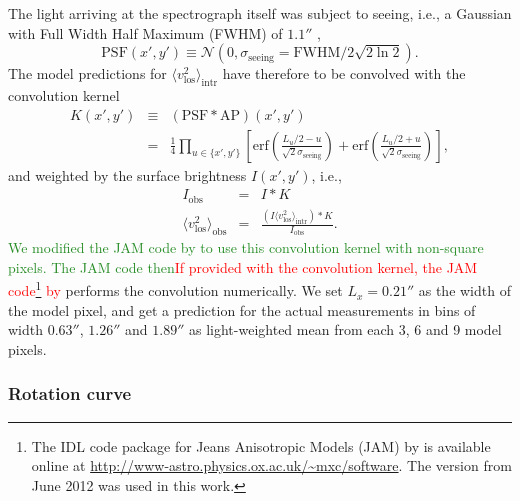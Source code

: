\documentclass[useAMS,usenatbib]{mnras}
\newcommand{\NEW}[1]{\textcolor{ForestGreen}{#1}}
\newcommand{\OLD}[1]{\textcolor{Red}{#1}}
\begin{document}
The light arriving at the spectrograph itself was subject to seeing, i.e., a Gaussian with Full Width Half Maximum (FWHM) of $1.1''$ \citep{SWELLSV},
\begin{equation}
\text{PSF}(x',y')\equiv\mathscr{N}(0,\sigma_\text{seeing}=\text{FWHM}/2\sqrt{2\ln2}).
\end{equation}
The model predictions for $\langle v_\text{los}^2 \rangle_\text{intr}$ have therefore to be convolved with the convolution kernel
\begin{eqnarray}
K(x',y') &\equiv& (\text{PSF} \ast \text{AP})(x',y') \nonumber\\
&=& \frac{1}{4} \prod_{u \in \{x',y'\}} \left[ \text{erf}\left( \frac{L_u/2 - u}{\sqrt{2}\sigma_\text{seeing}}\right) + \text{erf} \left( \frac{L_u/2 + u}{\sqrt{2} \sigma_\text{seeing}} \right) \right],
\end{eqnarray}
and weighted by the surface brightness $I(x',y')$, i.e.,
\begin{eqnarray}
I_\text{obs} &=& I \ast K\\
\langle v_\text{los}^2 \rangle_\text{obs} &=& \frac{(I \langle v_\text{los}^2\rangle_\text{intr}) \ast K}{I_\text{obs}}.
\end{eqnarray}
\NEW{We modified the JAM code by \citet{Cap08} to use this convolution kernel with non-square pixels. The JAM code then}\OLD{If provided with the convolution kernel, the JAM code\footnote{The IDL code package for Jeans Anisotropic Models (JAM) by \citet{Cap08} is available online at \url{http://www-astro.physics.ox.ac.uk/~mxc/software}. The version from June 2012 was used in this work.} by \citet{Cap08}} performs the convolution numerically. We set $L_x = 0.21''$ as the width of the model pixel, and get a prediction for the actual measurements in bins of width $0.63''$, $1.26''$ and $1.89''$ \citep{SWELLSV} as light-weighted mean from each 3, 6 and 9 model pixels.

\subsubsection{Rotation curve} \label{sec:model_JAM_rotation}
\end{document}
